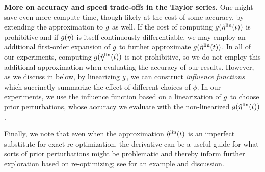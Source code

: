 \noindent \textbf{More on accuracy and speed trade-offs in the Taylor series.}
One might save even more compute time, though likely at the cost of some
accuracy, by extending the approximation to $g$ as well. If the cost of
computing $g(\hat\eta^{\mathrm{lin}}(t))$ is prohibitive and if $g(\eta)$ is itself
continuously differentiable, we may employ an additional first-order expansion
of $g$ to further approximate $g(\hat\eta^{\mathrm{lin}}(t))$. In all of our experiments,
computing $g(\hat\eta^{\mathrm{lin}}(t))$ is not prohibitive, so we do not employ this
additional approximation when evaluating the accuracy of our results. However,
as we discuss in  below, by linearizing $g$, we can
construct {\em influence functions} which succinctly summarize the effect of
different choices of $\phi$.  In our experiments, we use the influence function
based on a linearization of $g$ to choose prior perturbations, whose accuracy
we evaluate with the non-linearized $g(\hat\eta^{\mathrm{lin}}(t))$.

Finally, we note that even when the approximation $\hat\eta^{\mathrm{lin}}(t)$ is an imperfect
substitute for exact re-optimization, the derivative can be a useful guide for
what sorts of prior perturbations might be problematic and thereby inform
further exploration based on re-optimizing; see  for
an example and discussion.
